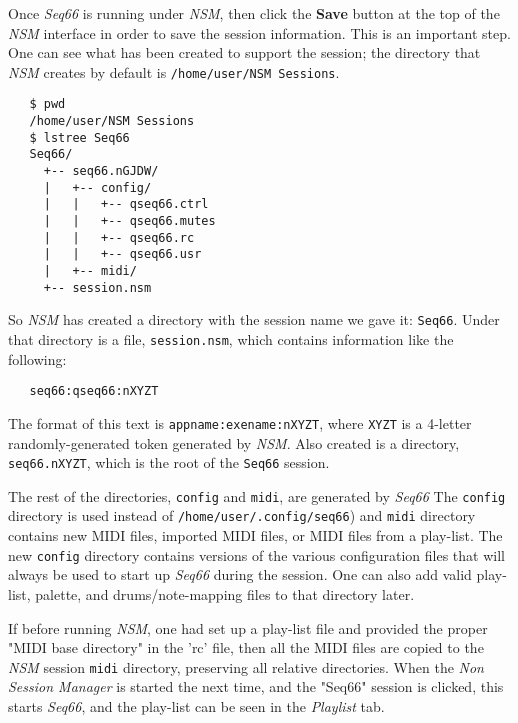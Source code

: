    Once \textsl{Seq66} is running under \textsl{NSM},
   then click the \textbf{Save}
   button at the top of the \textsl{NSM} interface in order
   to save the session information.  This is an important step.
   One can see what has been created to support the session;
   the directory that \textsl{NSM}
   creates by default is \texttt{/home/user/NSM Sessions}.

\begin{verbatim}
   $ pwd
   /home/user/NSM Sessions
   $ lstree Seq66
   Seq66/
     +-- seq66.nGJDW/
     |   +-- config/
     |   |   +-- qseq66.ctrl
     |   |   +-- qseq66.mutes
     |   |   +-- qseq66.rc
     |   |   +-- qseq66.usr
     |   +-- midi/
     +-- session.nsm
\end{verbatim}

   So \textsl{NSM} has created a directory with the session name we gave it:
   \texttt{Seq66}.  Under that directory is a file, \texttt{session.nsm}, which
   contains information like the following:

\begin{verbatim}
   seq66:qseq66:nXYZT
\end{verbatim}

   The format of this text is \texttt{appname:exename:nXYZT}, where
   \texttt{XYZT} is a 4-letter randomly-generated token
   generated by \textsl{NSM}.
   Also created is a directory, \texttt{seq66.nXYZT}, which is the root of the
   \texttt{Seq66} session.

   The rest of the directories,
   \texttt{config} and \texttt{midi},
   are generated by \textsl{Seq66}
   The \texttt{config} directory is used instead of
   \texttt{/home/user/.config/seq66}) and \texttt{midi} directory
   contains new MIDI files, imported MIDI files,
   or MIDI files from a play-list.
   The new \texttt{config} directory
   contains versions of the various configuration files that will always be
   used to start up \textsl{Seq66} during the session.
   One can also add valid play-list, palette, and drums/note-mapping files to
   that directory later.

   If before running \textsl{NSM},
   one had set up a play-list file and provided the proper "MIDI
   base directory" in the 'rc' file, then all the MIDI files are copied to
   the \textsl{NSM} session \texttt{midi} directory,
   preserving all relative directories.
   When the \textsl{Non Session Manager} is started the next time, and the
   "Seq66" session is clicked, this starts \textsl{Seq66}, and the play-list can
   be seen in the \textsl{Playlist} tab.

